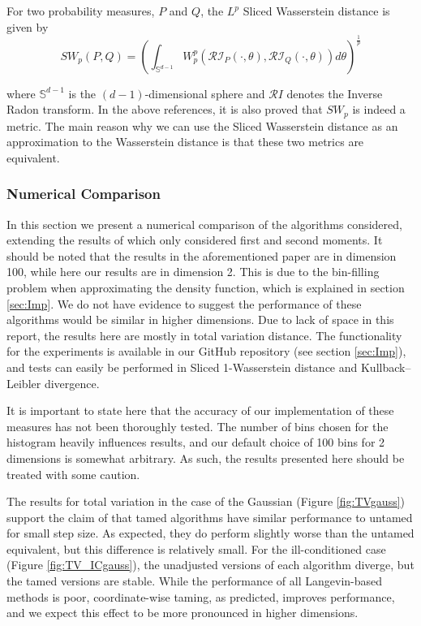 \begin{defn}
For two probability measures, $P$ and $Q$, the $L^p$ Sliced Wasserstein distance is given by
$$
SW_p(P,Q) = \left(\int_{\mathbb S^{d-1} }  W_p^p\left(\mathcal{RI}_P(\cdot, \theta), \mathcal{RI}_Q(\cdot, \theta) \right) d \theta \right)^{\frac 1 p}
$$
\end{defn}

where $\mathbb S^{d-1}$ is the $(d-1)$-dimensional sphere and $\mathcal RI$ denotes the Inverse Radon transform. In the above references, it is also proved that $SW_p$ is indeed a metric. The main reason why we can use the Sliced Wasserstein distance as an approximation to the Wasserstein distance is that these two metrics are equivalent\cite{Santa}.

\subsubsection{Numerical Comparison}
In this section we present a numerical comparison of the algorithms considered, extending the results of \cite{Brosse18tULA} which only considered first and second moments.  It should be noted that the results in the aforementioned paper are in dimension 100, while here our results are in dimension 2.  This is due to the bin-filling problem when approximating the density function, which is explained in section \ref{sec:Imp}.  We do not have evidence to suggest the performance of these algorithms would be similar in higher dimensions.  Due to lack of space in this report, the results here are mostly in total variation distance.  The functionality for the experiments is available in our GitHub repository (see section \ref{sec:Imp}), and tests can easily be performed in Sliced 1-Wasserstein distance and Kullback--Leibler divergence.

\begin{note}
    It is important to state here that the accuracy of our implementation of these measures has not been thoroughly tested.  The number of bins chosen for the histogram heavily influences results, and our default choice of 100 bins for 2 dimensions is somewhat arbitrary.  As such, the results presented here should be treated with some caution.
\end{note}
  

The results for total variation in the case of the Gaussian (Figure \ref{fig:TVgauss}) support the claim of \cite{Brosse18tULA} that tamed algorithms have similar performance to untamed for small step size.  As expected, they do perform slightly worse than the untamed equivalent, but this difference is relatively small.  For the ill-conditioned case (Figure \ref{fig:TV_ICgauss}), the unadjusted versions of each algorithm diverge, but the tamed versions are stable.  While the performance of all Langevin-based methods is poor, coordinate-wise taming, as predicted, improves performance, and we expect this effect to be more pronounced in higher dimensions.

